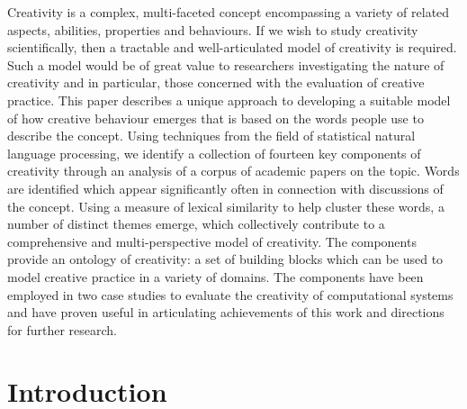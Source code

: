 \documentclass[10pt,letterpaper]{article}
\begin{document}
Creativity is a complex, multi-faceted concept encompassing a variety of related aspects, abilities, properties and behaviours. If we wish to study creativity scientifically, then a tractable and well-articulated model of creativity is required. Such a model would be of great value to researchers investigating the nature of creativity and in particular, those concerned with the evaluation of creative practice. This paper describes a unique approach to developing a suitable model of how creative behaviour emerges that is based on the words people use to describe the concept. Using techniques from the field of statistical natural language processing, we identify a collection of fourteen key components of creativity through an analysis of a corpus of academic papers on the topic. Words are identified which appear significantly often in connection with discussions of the concept. Using a measure of lexical similarity to help cluster these words, a number of distinct themes emerge, which collectively contribute to a comprehensive and multi-perspective model of creativity. The components provide an ontology of creativity: a set of building blocks which can be used to model creative practice in a variety of domains. The components have been employed in two case studies to evaluate the creativity of computational systems and have proven useful in articulating achievements of this work and directions for further research.



\linenumbers

\section*{Introduction}\label{intro}

\end{document}
